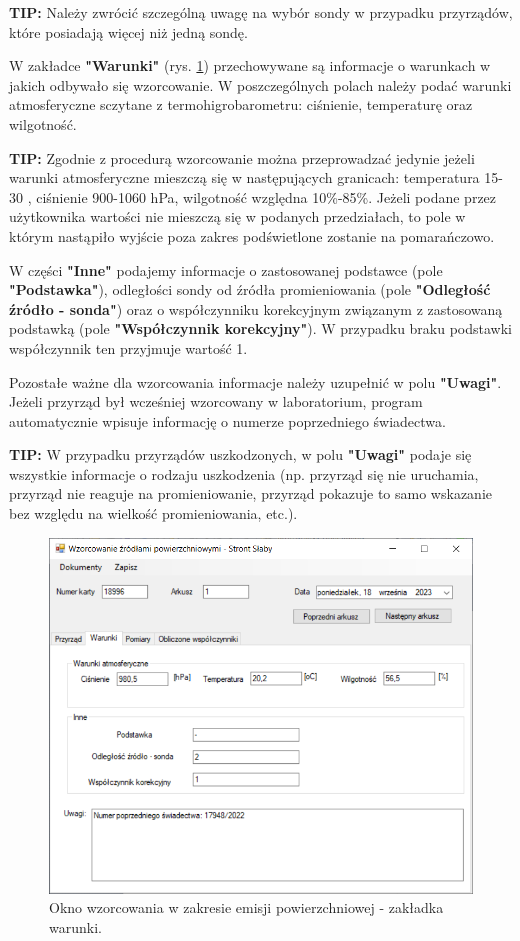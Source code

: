 	\textbf{TIP:} Należy zwrócić szczególną uwagę na wybór sondy w przypadku przyrządów, które posiadają więcej niż jedną sondę.
	
	W zakładce \textbf{"Warunki"} (rys. \ref{emisjaWarunki}) przechowywane są informacje o warunkach w jakich odbywało się wzorcowanie. W poszczególnych polach należy podać warunki atmosferyczne sczytane z termohigrobarometru: ciśnienie, temperaturę oraz wilgotność.
	
	\textbf{TIP:} Zgodnie z procedurą wzorcowanie można przeprowadzać jedynie jeżeli warunki atmosferyczne mieszczą się w następujących granicach: temperatura 15-30 \textcelsius, ciśnienie 900-1060 hPa,  wilgotność względna 10\%-85\%. Jeżeli podane przez użytkownika wartości nie mieszczą się w podanych przedziałach, to pole w którym nastąpiło wyjście poza zakres podświetlone zostanie na pomarańczowo.
	
	W części \textbf{"Inne"} podajemy informacje o zastosowanej podstawce (pole \textbf{"Podstawka"}), odległości sondy od źródła promieniowania (pole \textbf{"Odległość źródło - sonda"}) oraz o współczynniku korekcyjnym związanym z zastosowaną podstawką (pole \textbf{"Współczynnik korekcyjny"}). W przypadku braku podstawki współczynnik ten przyjmuje wartość 1.
	
	Pozostałe ważne dla wzorcowania informacje należy uzupełnić w polu \textbf{"Uwagi"}. Jeżeli przyrząd był wcześniej wzorcowany w laboratorium, program automatycznie wpisuje informację o numerze poprzedniego świadectwa.  
	
	\textbf{TIP:} W przypadku przyrządów uszkodzonych, w polu \textbf{"Uwagi"} podaje się wszystkie informacje o rodzaju uszkodzenia (np. przyrząd się nie uruchamia, przyrząd nie reaguje na promieniowanie, przyrząd pokazuje to samo wskazanie bez względu na wielkość promieniowania, etc.).
	
	\begin{figure}[htb]
		\centering
		\includegraphics[width=\columnwidth]{obrazki/Wzorcowanie/emisja/warunki.png}
		\caption{Okno wzorcowania w zakresie emisji powierzchniowej - zakładka warunki.}
		\label{emisjaWarunki}
	\end{figure}
	
